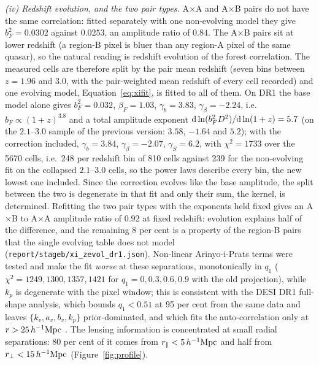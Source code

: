 \documentclass[11pt,a4paper]{article}
\newcommand{\Mpch}{\,h^{-1}{\rm Mpc}}
\begin{document}
\emph{(iv) Redshift evolution, and the two pair types.} A$\times$A and A$\times$B pairs do not have the same correlation: fitted separately with one non-evolving model they give $b_F^2=0.0302$ against $0.0253$, an amplitude ratio of $0.84$. The A$\times$B pairs sit at lower redshift (a region-B pixel is bluer than any region-A pixel of the same quasar), so the natural reading is redshift evolution of the forest correlation. The measured cells are therefore split by the pair mean redshift (seven bins between $z=1.96$ and $3.0$, with the pair-weighted mean redshift of every cell recorded) and one evolving model, Equation~\eqref{eq:xifit}, is fitted to all of them.
On DR1 the base model alone gives $b_F^2=0.032$, $\beta_F=1.03$, $\gamma_b=3.83$, $\gamma_\beta=-2.24$, i.e.\ $b_F\propto(1+z)^{3.8}$ and a total amplitude exponent ${\rm d}\ln(b_F^2D^2)/{\rm d}\ln(1+z)=5.7$ (on the $2.1$--$3.0$ sample of the previous version: $3.58$, $-1.64$ and $5.2$); with the correction included, $\gamma_b=3.84$, $\gamma_\beta=-2.07$, $\gamma_S=6.2$, with $\chi^2=1733$ over the 5670 cells, i.e.\ 248 per redshift bin of 810 cells against 239 for the non-evolving fit on the collapsed $2.1$--$3.0$ cells, so the power laws describe every bin, the new lowest one included. Since the correction evolves like the base amplitude, the split between the two is degenerate in that fit and only their sum, the kernel, is determined. Refitting the two pair types with the exponents held fixed gives an A$\times$B to A$\times$A amplitude ratio of $0.92$ at fixed redshift: evolution explains half of the difference, and the remaining 8 per cent is a property of the region-B pairs that the single evolving table does not model (\texttt{report/stageb/xi\_zevol\_dr1.json}). Non-linear Arinyo-i-Prats terms were tested and make the fit \emph{worse} at these separations, monotonically in $q_1$ ($\chi^2=1249,1300,1357,1421$ for $q_1=0,0.3,0.6,0.9$ with the old projection), while $k_p$ is degenerate with the pixel window; this is consistent with the DESI DR1 full-shape analysis, which bounds $q_1<0.51$ at 95 per cent from the same data and leaves $\{k_v,a_v,b_v,k_p\}$ prior-dominated, and which fits the auto-correlation only at $r>25\Mpch$ \citep{2509.15308}. The lensing information is concentrated at small radial separations: 80 per cent of it comes from $r_\parallel<5\Mpch$ and half from $r_\perp<15\Mpch$ (Figure~\ref{fig:profile}).
\end{document}
